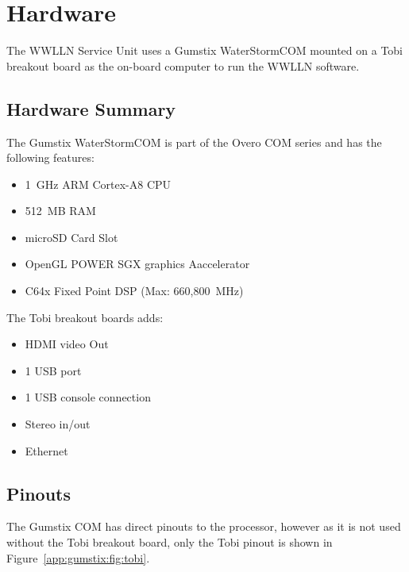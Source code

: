 \section{Hardware}

The WWLLN Service Unit uses a Gumstix WaterStormCOM mounted on a Tobi breakout board as the on-board computer to run the WWLLN software.

\subsection{Hardware Summary}

The Gumstix WaterStormCOM is part of the Overo COM series and has the following features:

\begin{itemize}
\item 1~GHz ARM Cortex-A8 CPU
\item 512~MB RAM
\item microSD Card Slot
\item OpenGL POWER SGX graphics Aaccelerator
\item C64x Fixed Point DSP (Max: 660,800~MHz)
\end{itemize}

The Tobi breakout boards adds:

\begin{itemize}
\item HDMI video Out
\item 1 USB port
\item 1 USB console connection
\item Stereo in/out
\item Ethernet
\end{itemize}

\subsection{Pinouts}

The Gumstix COM has direct pinouts to the processor, however as it is not used without the Tobi breakout board, only the Tobi pinout is shown in Figure~\ref{app:gumstix:fig:tobi}.

